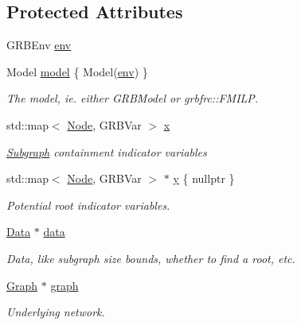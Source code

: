 \subsection*{Protected Attributes}
\begin{DoxyCompactItemize}
\item 
G\+R\+B\+Env \hyperlink{classderegnet_1_1DeregnetModel_accd03120356b80b083041b4eef003e5b}{env}
\item 
Model \hyperlink{classderegnet_1_1DeregnetModel_a30d525de2086e342b33fe3e45ede4947}{model} \{ Model(\hyperlink{classderegnet_1_1DeregnetModel_accd03120356b80b083041b4eef003e5b}{env}) \}
\begin{DoxyCompactList}\small\item\em The model, ie. either G\+R\+B\+Model or grbfrc\+::\+F\+M\+I\+LP. \end{DoxyCompactList}\item 
std\+::map$<$ \hyperlink{namespacederegnet_a744bad34f2de9856d36715a445f027f3}{Node}, G\+R\+B\+Var $>$ \hyperlink{classderegnet_1_1DeregnetModel_a360c980f3fec4dfbab50e9bb06a933a8}{x}
\begin{DoxyCompactList}\small\item\em \textquotesingle{}\hyperlink{structderegnet_1_1Subgraph}{Subgraph} containment\textquotesingle{} indicator variables \end{DoxyCompactList}\item 
std\+::map$<$ \hyperlink{namespacederegnet_a744bad34f2de9856d36715a445f027f3}{Node}, G\+R\+B\+Var $>$ $\ast$ \hyperlink{classderegnet_1_1DeregnetModel_ae76df61afe302b939165facf3dd21ac8}{y} \{ nullptr \}
\begin{DoxyCompactList}\small\item\em Potential \textquotesingle{}root\textquotesingle{} indicator variables. \end{DoxyCompactList}\item 
\hyperlink{avgdrgnt_8cpp_a1d1235306db276e9b36acba1db1509e8}{Data} $\ast$ \hyperlink{classderegnet_1_1DeregnetModel_ad5399761cf6293a702f3800bda4806d1}{data}
\begin{DoxyCompactList}\small\item\em Data, like subgraph size bounds, whether to find a root, etc. \end{DoxyCompactList}\item 
\hyperlink{namespacederegnet_a55b76c55bbabc682cbc61f8b9948799e}{Graph} $\ast$ \hyperlink{classderegnet_1_1DeregnetModel_a3cd2f54b8e061ef5bed32708d9bc1ef1}{graph}
\begin{DoxyCompactList}\small\item\em Underlying network. \end{DoxyCompactList}\item 

\end{DoxyCompactItemize}
